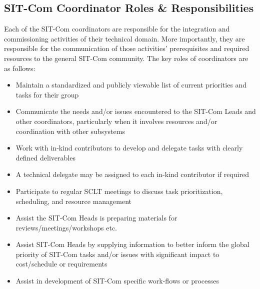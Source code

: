 \documentclass[SE,toc]{lsstdoc}
\begin{document}
\subsection{SIT-Com Coordinator Roles \& Responsibilities}
Each of the SIT-Com coordinators are responsible for the integration and commissioning activities of their technical domain.
More importantly, they are responsible for the communication of those activities’ prerequisites and required resources to the general SIT-Com community.
The key roles of coordinators are as follows:
\begin{itemize}
    \item Maintain a standardized and publicly viewable list of current priorities and tasks for their group
    \item Communicate the needs and/or issues encountered to the SIT-Com Leads and other coordinators, particularly when it involves resources and/or coordination with other subsystems
    \item Work with in-kind contributors to develop and delegate tasks with clearly defined deliverables
    \item A technical delegate may be assigned to each in-kind contributor if required
    \item Participate to regular SCLT meetings to discuss task prioritization, scheduling, and resource management
    \item Assist the SIT-Com Heads is preparing materials for reviews/meetings/workshops etc.
    \item Assist SIT-Com Heads by supplying information to better inform the global priority of SIT-Com tasks and/or issues with significant impact to cost/schedule or requirements
    \item Assist in development of SIT-Com specific work-flows or processes
\end{itemize}
\end{document}
